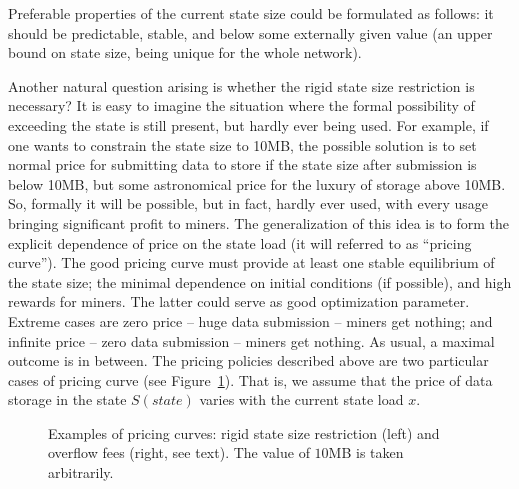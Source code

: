 \documentclass[]{llncs}   %
\begin{document}
Preferable properties of the current state size could be formulated as follows:
it should be predictable, stable, and below some externally given value (an upper
bound on state size, being unique for the whole network). 

Another natural question arising is whether the rigid state size restriction is
necessary?  It is easy to imagine the situation where the formal possibility of
exceeding the state is still present, but hardly ever being used. For example,
if one wants to constrain the state size to 10MB, the possible solution is to
set normal price for submitting data to store if the state size after submission
is below 10MB, but some astronomical price for the luxury of storage above 10MB.
So, formally it will be possible, but in fact, hardly ever used, with every
usage bringing significant profit to miners. The generalization of this idea is
to form the explicit dependence of price on the state load (it will referred to
as ``pricing curve''). The good pricing curve must provide at least one stable
equilibrium of the state size; the minimal dependence on initial conditions (if
possible), and high rewards for miners. The latter could serve as good
optimization parameter. Extreme cases are zero price -- huge data submission --
miners get nothing; and infinite price -- zero data submission -- miners get
nothing. As usual, a maximal outcome is in between.  The pricing policies
described above are two particular cases of pricing curve (see
Figure~\ref{fig:steps}). That is, we assume that the price of data storage in the
state $S(state)$ varies with the current state load $x$. 
\begin{figure} 
    \hfill 
    \hfill 
    \hfill 
    \caption{ 
        Examples of pricing curves: rigid state size restriction (left) and 
        overflow fees (right, see text). The value of $10$MB is taken 
        arbitrarily.  
    } 
    \label{fig:steps}
\end{figure} 
\end{document}
